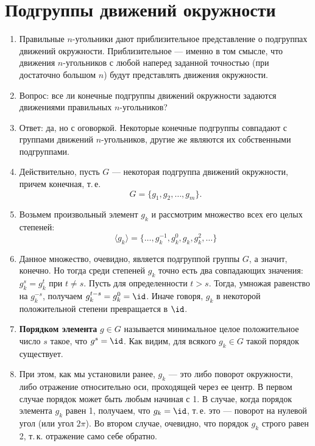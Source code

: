 \section{Подгруппы движений окружности}


\begin{enumerate}
\item Правильные $n$-угольники дают приблизительное представление о подгруппах движений окружности. Приблизительное --- именно в том смысле, что движения $n$-угольников с любой наперед заданной точностью (при достаточно большом $n$) будут представлять движения окружности.
\item Вопрос: все ли конечные подгруппы движений окружности задаются движениями правильных $n$-угольников?
\item Ответ: да, но с оговоркой. Некоторые конечные подгруппы совпадают с группами движений $n$-угольников, другие же являются их собственными подгруппами.
\item Действительно, пусть $G$ --- некоторая подгруппа движений окружности, причем конечная, т.\,е.
$$
G=\{g_1,g_2,\dots,g_m\}.
$$
\item Возьмем произвольный элемент $g_k$ и рассмотрим множество всех его целых степеней:
$$
\langle g_k\rangle=\{\dots,g_k^{-1},g_k^0,g_k,g_k^2,\dots\}
$$
\item Данное множество, очевидно, является подгруппой группы $G$, а значит, конечно. Но тогда среди степеней $g_k$ точно есть два совпадающих значения: $g_k^s=g_k^t$ при $t\ne s$. Пусть для определенности $t>s$. Тогда, умножая равенство на $g_k^{-s}$, получаем $g_k^{t-s}=g_k^0=\id$. Иначе говоря, $g_k$ в некоторой положительной степени превращается в $\id$.
\item \textbf{Порядком элемента} $g\in G$ называется минимальное целое положительное число $s$ такое, что $g^s=\id$. Как видим, для всякого $g_k\in G$ такой порядок существует.
\item При этом, как мы установили ранее, $g_k$ --- это либо поворот окружности, либо отражение относительно оси, проходящей через ее центр. В первом случае порядок может быть любым начиная с 1. В случае, когда порядок элемента $g_k$ равен 1, получаем, что $g_k=\id$, т.\,е. это --- поворот на нулевой угол (или угол $2\pi$). Во втором случае, очевидно, что порядок $g_k$ строго равен 2, т.\,к. отражение само себе обратно.

\end{enumerate}
